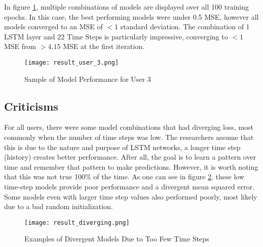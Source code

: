     In figure \ref{fig:results-user-3}, multiple combinations of models are displayed over all 100 training epochs. In this case, the best performing models were under 0.5 MSE, however all models converged to an MSE of $<1$ standard deviation. The combination of 1 LSTM layer and 22 Time Steps is particularly impressive, converging to $<1$ MSE from $>4.15$ MSE at the first iteration.
        \begin{figure}
            \texttt{[image: result\_user\_3.png]}
            \caption{Sample of Model Performance for User 3}
            \label{fig:results-user-3}
        \end{figure}
        
    \subsection{Criticisms}
    For all users, there were some model combinations that had diverging loss, most commonly when the number of time steps was low. The researchers assume that this is due to the nature and purpose of LSTM networks, a longer time step (history) creates better performance. After all, the goal is to learn a pattern over time and remember that pattern to make predictions.  However, it is worth noting that this was not true 100\% of the time.  As one can see in figure \ref{fig:results-divergent}, these low time-step models provide poor performance and a divergent mean squared error. Some models even with larger time step values also performed poorly, most likely due to a bad random initialization.
        \begin{figure}
            \texttt{[image: result\_diverging.png]}
            \caption{Examples of Divergent Models Due to Too Few Time Steps}
            \label{fig:results-divergent}
        \end{figure}
